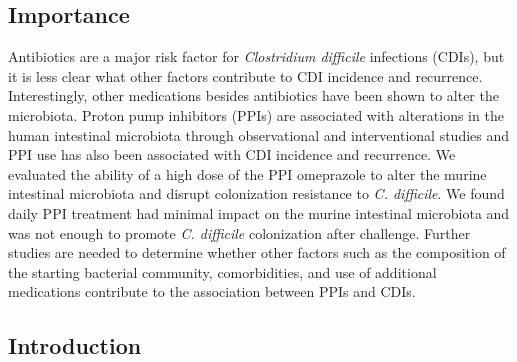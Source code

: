 \documentclass[11pt,]{article}
\begin{document}
\subsection{Importance}\label{importance}

Antibiotics are a major risk factor for \emph{Clostridium difficile}
infections (CDIs), but it is less clear what other factors contribute to
CDI incidence and recurrence. Interestingly, other medications besides
antibiotics have been shown to alter the microbiota. Proton pump
inhibitors (PPIs) are associated with alterations in the human
intestinal microbiota through observational and interventional studies
and PPI use has also been associated with CDI incidence and recurrence.
We evaluated the ability of a high dose of the PPI omeprazole to alter
the murine intestinal microbiota and disrupt colonization resistance to
\emph{C. difficile}. We found daily PPI treatment had minimal impact on
the murine intestinal microbiota and was not enough to promote \emph{C.
difficile} colonization after challenge. Further studies are needed to
determine whether other factors such as the composition of the starting
bacterial community, comorbidities, and use of additional medications
contribute to the association between PPIs and CDIs.

\newpage

\subsection{Introduction}\label{introduction}
\end{document}
